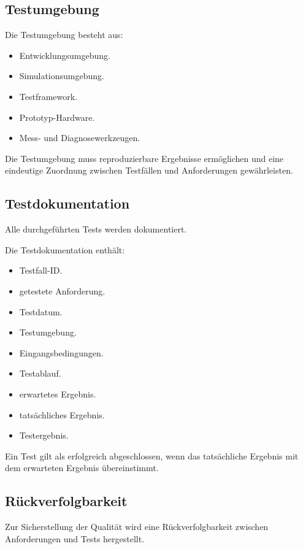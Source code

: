 \documentclass[
  a4paper,
  12pt,
  DIV=12,        %
  parskip=half,  %
  headings=small %
]{scrartcl}
\theoremstyle{definition}
\providecommand{\tightlist}{%
  \setlength{\itemsep}{0pt}\setlength{\parskip}{0pt}}
\theoremstyle{definition}
\begin{document}
\subsection{Testumgebung}\label{testumgebung}

Die Testumgebung besteht aus:

\begin{itemize}
\tightlist
\item
  Entwicklungsumgebung.
\item
  Simulationsumgebung.
\item
  Testframework.
\item
  Prototyp-Hardware.
\item
  Mess- und Diagnosewerkzeugen.
\end{itemize}

Die Testumgebung muss reproduzierbare Ergebnisse ermöglichen und eine
eindeutige Zuordnung zwischen Testfällen und Anforderungen
gewährleisten.

\subsection{Testdokumentation}\label{testdokumentation}

Alle durchgeführten Tests werden dokumentiert.

Die Testdokumentation enthält:

\begin{itemize}
\tightlist
\item
  Testfall-ID.
\item
  getestete Anforderung.
\item
  Testdatum.
\item
  Testumgebung.
\item
  Eingangsbedingungen.
\item
  Testablauf.
\item
  erwartetes Ergebnis.
\item
  tatsächliches Ergebnis.
\item
  Testergebnis.
\end{itemize}

Ein Test gilt als erfolgreich abgeschlossen, wenn das tatsächliche
Ergebnis mit dem erwarteten Ergebnis übereinstimmt.

\subsection{Rückverfolgbarkeit}\label{ruxfcckverfolgbarkeit}

Zur Sicherstellung der Qualität wird eine Rückverfolgbarkeit zwischen
Anforderungen und Tests hergestellt.
\end{document}
